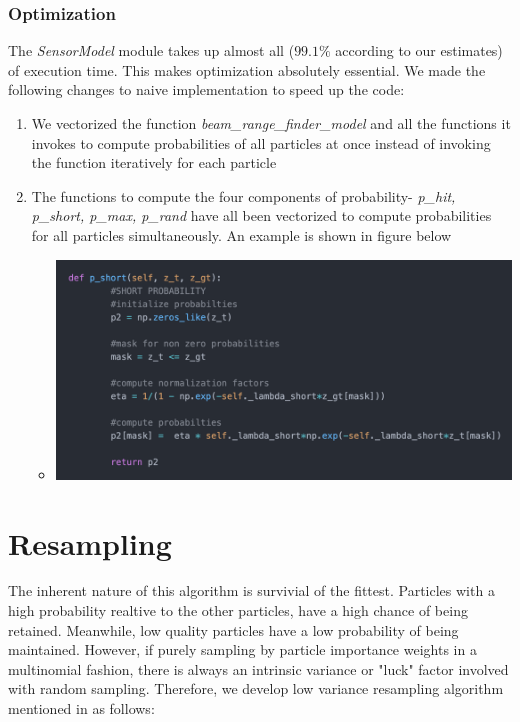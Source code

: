 \documentclass[12pt, a4paper]{article}
\begin{document}
\subsubsection{Optimization}
The \textit{SensorModel} module takes up almost all ($99.1\%$ according to our estimates) of execution time. This makes optimization absolutely essential. We made the following changes to naive implementation to speed up the code:
\begin{enumerate}
  \item We vectorized the function \textit{beam\_range\_finder\_model} and all the functions it invokes to compute probabilities of all particles at once instead of invoking the function iteratively for each particle
  \item The functions to compute the four components of probability- \textit{p\_hit, p\_short, p\_max, p\_rand} have all been vectorized to compute probabilities for all particles simultaneously. An example is shown in figure below
  \begin{itemize}
    \item 
    \begin{minipage}[t]{\linewidth}
      \vspace{0pt}
      \begin{center}
        \includegraphics[scale=0.3]{./results/sensor_model_opt.png}
        \label{fig:sm_1}
      \end{center}
    \end{minipage}
  \end{itemize}
\end{enumerate}



\section{Resampling}
The inherent nature of this algorithm is survivial of the fittest. Particles with a high probability realtive to the other particles, have a high chance of being retained. Meanwhile, low quality particles have a low probability of being maintained. However, if purely sampling by particle importance weights in a multinomial fashion, there is always an intrinsic variance or "luck" factor involved with random sampling. Therefore, we develop  low variance resampling algorithm mentioned in \cite{ProbRob} as follows:
\end{document}
